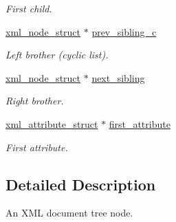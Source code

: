 \begin{DoxyCompactItemize}
\begin{DoxyCompactList}\small\item\em First child. \item\end{DoxyCompactList}\item 
\hypertarget{structphys_1_1xml_1_1xml__node__struct_abd5a4c8311ff0e07f3730d4c3cced1f0}{
\hyperlink{structphys_1_1xml_1_1xml__node__struct}{xml\_\-node\_\-struct} $\ast$ \hyperlink{structphys_1_1xml_1_1xml__node__struct_abd5a4c8311ff0e07f3730d4c3cced1f0}{prev\_\-sibling\_\-c}}
\label{da/d96/structphys_1_1xml_1_1xml__node__struct_abd5a4c8311ff0e07f3730d4c3cced1f0}

\begin{DoxyCompactList}\small\item\em Left brother (cyclic list). \item\end{DoxyCompactList}\item 
\hypertarget{structphys_1_1xml_1_1xml__node__struct_ad890ef1831e4a40b4c304c038eeffffa}{
\hyperlink{structphys_1_1xml_1_1xml__node__struct}{xml\_\-node\_\-struct} $\ast$ \hyperlink{structphys_1_1xml_1_1xml__node__struct_ad890ef1831e4a40b4c304c038eeffffa}{next\_\-sibling}}
\label{da/d96/structphys_1_1xml_1_1xml__node__struct_ad890ef1831e4a40b4c304c038eeffffa}

\begin{DoxyCompactList}\small\item\em Right brother. \item\end{DoxyCompactList}\item 
\hypertarget{structphys_1_1xml_1_1xml__node__struct_a8cb165d985d43b74a7d50ea12802ba1f}{
\hyperlink{structphys_1_1xml_1_1xml__attribute__struct}{xml\_\-attribute\_\-struct} $\ast$ \hyperlink{structphys_1_1xml_1_1xml__node__struct_a8cb165d985d43b74a7d50ea12802ba1f}{first\_\-attribute}}
\label{da/d96/structphys_1_1xml_1_1xml__node__struct_a8cb165d985d43b74a7d50ea12802ba1f}

\begin{DoxyCompactList}\small\item\em First attribute. \item\end{DoxyCompactList}\end{DoxyCompactItemize}


\subsection{Detailed Description}
An XML document tree node. 


